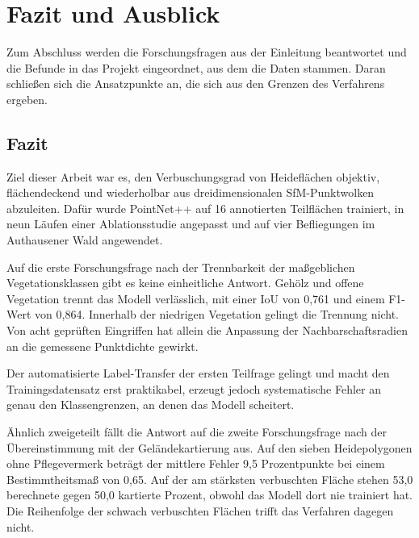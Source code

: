 \newpage
\section{Fazit und Ausblick}\label{ausblick}

Zum Abschluss werden die Forschungsfragen aus der Einleitung beantwortet und die Befunde in das Projekt eingeordnet, aus dem die Daten stammen. Daran schließen sich die Ansatzpunkte an, die sich aus den Grenzen des Verfahrens ergeben.


\subsection{Fazit}\label{fazit}

Ziel dieser Arbeit war es, den Verbuschungsgrad von Heideflächen objektiv,
flächendeckend und wiederholbar aus dreidimensionalen SfM-Punktwolken
abzuleiten. Dafür wurde PointNet++ auf 16 annotierten Teilflächen trainiert, in
neun Läufen einer Ablationsstudie angepasst und auf vier Befliegungen im
Authausener Wald angewendet.

Auf die erste Forschungsfrage nach der Trennbarkeit der maßgeblichen
Vegetationsklassen gibt es keine einheitliche Antwort. Gehölz und offene
Vegetation trennt das Modell verlässlich, mit einer IoU von 0,761 und einem
F1-Wert von 0,864. Innerhalb der niedrigen Vegetation gelingt die Trennung nicht. Von acht geprüften Eingriffen hat allein die Anpassung der Nachbarschaftsradien an die gemessene Punktdichte gewirkt.

Der automatisierte Label-Transfer der ersten Teilfrage gelingt und macht
den Trainingsdatensatz erst praktikabel, erzeugt jedoch systematische Fehler
an genau den Klassengrenzen, an denen das Modell scheitert.

Ähnlich zweigeteilt fällt die Antwort auf die zweite Forschungsfrage nach der
Übereinstimmung mit der Geländekartierung aus. Auf den sieben Heidepolygonen ohne
Pflegevermerk beträgt der mittlere Fehler 9,5 Prozentpunkte bei einem
Bestimmtheitsmaß von 0,65. Auf der am stärksten verbuschten Fläche stehen
53,0 berechnete gegen 50,0 kartierte Prozent, obwohl das Modell dort nie
trainiert hat. Die Reihenfolge der schwach verbuschten Flächen trifft das
Verfahren dagegen nicht.

